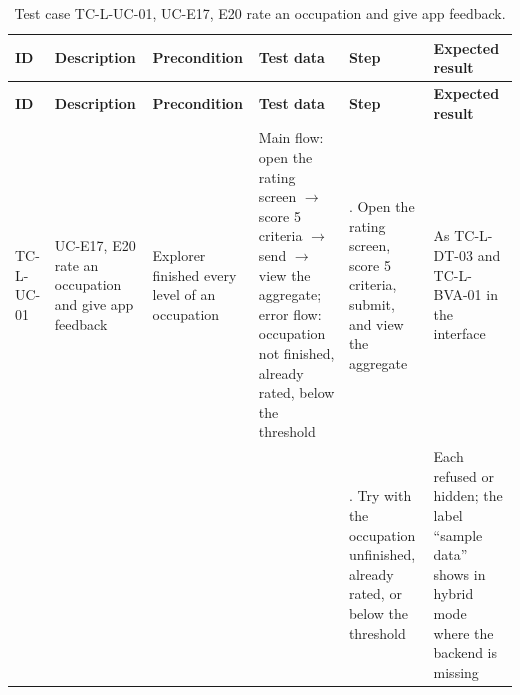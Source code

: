 {\footnotesize{}\renewcommand{\arraystretch}{1.1}
\begin{longtable}{|>{\raggedright\arraybackslash}p{}|>{\raggedright\arraybackslash}p{}|>{\raggedright\arraybackslash}p{}|>{\raggedright\arraybackslash}p{}|>{\raggedright\arraybackslash}p{}|>{\raggedright\arraybackslash}p{}|}
\caption{Test case TC-L-UC-01, UC-E17, E20 rate an occupation and give app feedback.} \\
\hline
\textbf{ID} & \textbf{Description} & \textbf{Precondition} & \textbf{Test data} & \textbf{Step} & \textbf{Expected result} \\ \hline
\endfirsthead
\hline
\textbf{ID} & \textbf{Description} & \textbf{Precondition} & \textbf{Test data} & \textbf{Step} & \textbf{Expected result} \\ \hline
\endhead
TC-L-UC-01 & UC-E17, E20 rate an occupation and give app feedback & Explorer finished every level of an occupation & Main flow: open the rating screen $\rightarrow$ score 5 criteria $\rightarrow$ send $\rightarrow$ view the aggregate; error flow: occupation not finished, already rated, below the threshold & 1. Open the rating screen, score 5 criteria, submit, and view the aggregate & As TC-L-DT-03 and TC-L-BVA-01 in the interface \\ \cline{5-6}
 &  &  &  & 2. Try with the occupation unfinished, already rated, or below the threshold & Each refused or hidden; the label ``sample data'' shows in hybrid mode where the backend is missing \\ \hline
\end{longtable}
}


